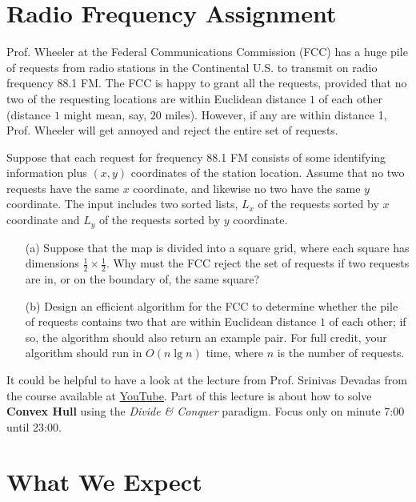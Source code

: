 \documentclass[11pt]{article}
\begin{document}
\section{Radio Frequency Assignment}\label{sec:assignment}
Prof. Wheeler at the Federal Communications Commission (FCC) has a huge pile of requests from radio stations in the Continental U.S. to transmit on radio frequency 88.1 FM. The FCC is happy to grant all the requests, provided that no two of the requesting locations are within Euclidean distance $1$ of each other (distance $1$ might mean, say, $20$ miles). However, if any are within distance 1, Prof. Wheeler will get annoyed and reject the entire set of requests.

Suppose that each request for frequency 88.1 FM consists of some identifying information plus $(x, y)$ coordinates of the station location. Assume that no two requests have the same $x$ coordinate, and likewise no two have the same $y$ coordinate. The input includes two sorted lists, $L_x$ of the requests sorted by $x$ coordinate and $L_y$ of the requests sorted by $y$ coordinate.

\begin{enumerate}
    \item[(a)] Suppose that the map is divided into a square grid, where each square has dimensions $\frac{1}{2} \times \frac{1}{2}$. Why must the FCC reject the set of requests if two requests are in, or on the boundary of, the same square?

    \item[(b)] Design an efficient algorithm for the FCC to determine whether the pile of requests contains two that are within Euclidean distance $1$ of each other; if so, the algorithm should also return an example pair. For full credit, your algorithm should run in $O(n \lg n)$ time, where $n$ is the number of requests.
\end{enumerate}

\begin{tcolorbox}[title=Note]
  It could be helpful to have a look at the lecture from Prof. Srinivas Devadas from the course available at \href{https://youtu.be/EzeYI7p9MjU?si=VGDHQfO3l3yC_FwU}{YouTube}.  Part of this lecture is about how to solve \textbf{Convex Hull} using the \textit{Divide \& Conquer} paradigm.  Focus only on minute 7:00 until 23:00.
\end{tcolorbox}

\section{What We Expect}
\end{document}
